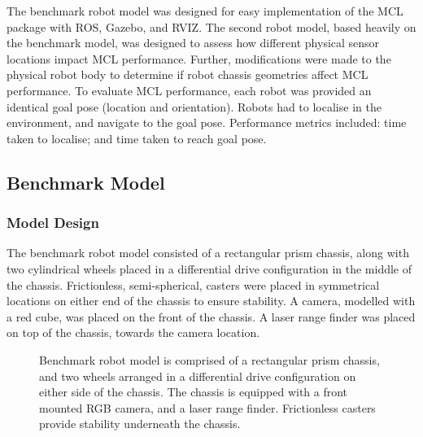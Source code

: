 \documentclass[a4paper]{article}
\begin{document}
The benchmark robot model was designed for easy implementation of the MCL package with ROS, Gazebo, and RVIZ. The second robot model, based heavily on the benchmark model, was designed to assess how different physical sensor locations impact MCL performance. Further, modifications were made to the physical robot body to determine if robot chassis geometries affect MCL performance. To evaluate MCL performance, each robot was provided an identical goal pose (location and orientation). Robots had to localise in the environment, and navigate to the goal pose. Performance metrics included: time taken to localise; and time taken to reach goal pose.

\subsection{Benchmark Model}
\subsubsection{Model Design}
The benchmark robot model consisted of a rectangular prism chassis, along with two cylindrical wheels placed in a differential drive configuration in the middle of the chassis. Frictionless, semi-spherical, casters were placed in symmetrical locations on either end of the chassis to ensure stability. A camera, modelled with a red cube, was placed on the front of the chassis. A laser range finder was placed on top of the chassis, towards the camera location.
\begin{figure}[h]
\centering
{}
\caption{Benchmark robot model is comprised of a rectangular prism chassis, and two wheels arranged in a differential drive configuration on either side of the chassis. The chassis is equipped with a front mounted RGB camera, and a laser range finder. Frictionless casters provide stability underneath the chassis.}
\end{figure}
\end{document}
